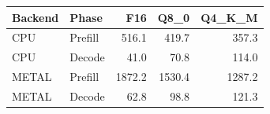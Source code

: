\begin{tabular}{llrrr}
\toprule
Backend & Phase & F16 & Q8\_0 & Q4\_K\_M \\
\midrule
CPU & Prefill & 516.1 & 419.7 & 357.3 \\
CPU & Decode & 41.0 & 70.8 & 114.0 \\
METAL & Prefill & 1872.2 & 1530.4 & 1287.2 \\
METAL & Decode & 62.8 & 98.8 & 121.3 \\
\bottomrule
\end{tabular}
